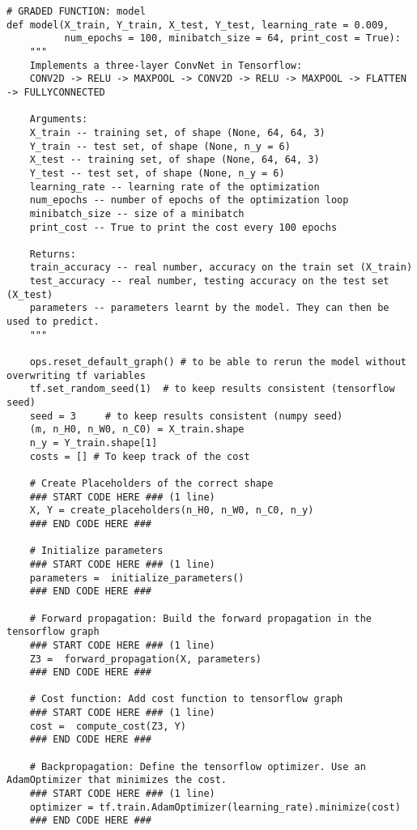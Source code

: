 \begin{verbatim}
# GRADED FUNCTION: model
def model(X_train, Y_train, X_test, Y_test, learning_rate = 0.009,
          num_epochs = 100, minibatch_size = 64, print_cost = True):
    """
    Implements a three-layer ConvNet in Tensorflow:
    CONV2D -> RELU -> MAXPOOL -> CONV2D -> RELU -> MAXPOOL -> FLATTEN -> FULLYCONNECTED
    
    Arguments:
    X_train -- training set, of shape (None, 64, 64, 3)
    Y_train -- test set, of shape (None, n_y = 6)
    X_test -- training set, of shape (None, 64, 64, 3)
    Y_test -- test set, of shape (None, n_y = 6)
    learning_rate -- learning rate of the optimization
    num_epochs -- number of epochs of the optimization loop
    minibatch_size -- size of a minibatch
    print_cost -- True to print the cost every 100 epochs
    
    Returns:
    train_accuracy -- real number, accuracy on the train set (X_train)
    test_accuracy -- real number, testing accuracy on the test set (X_test)
    parameters -- parameters learnt by the model. They can then be used to predict.
    """
    
    ops.reset_default_graph() # to be able to rerun the model without overwriting tf variables
    tf.set_random_seed(1)  # to keep results consistent (tensorflow seed)
    seed = 3     # to keep results consistent (numpy seed)
    (m, n_H0, n_W0, n_C0) = X_train.shape             
    n_y = Y_train.shape[1]                            
    costs = [] # To keep track of the cost
    
    # Create Placeholders of the correct shape
    ### START CODE HERE ### (1 line)
    X, Y = create_placeholders(n_H0, n_W0, n_C0, n_y)
    ### END CODE HERE ###

    # Initialize parameters
    ### START CODE HERE ### (1 line)
    parameters =  initialize_parameters()
    ### END CODE HERE ###
    
    # Forward propagation: Build the forward propagation in the tensorflow graph
    ### START CODE HERE ### (1 line)
    Z3 =  forward_propagation(X, parameters)
    ### END CODE HERE ###
    
    # Cost function: Add cost function to tensorflow graph
    ### START CODE HERE ### (1 line)
    cost =  compute_cost(Z3, Y)
    ### END CODE HERE ###
    
    # Backpropagation: Define the tensorflow optimizer. Use an AdamOptimizer that minimizes the cost.
    ### START CODE HERE ### (1 line)
    optimizer = tf.train.AdamOptimizer(learning_rate).minimize(cost)
    ### END CODE HERE ###
    

\end{verbatim}

